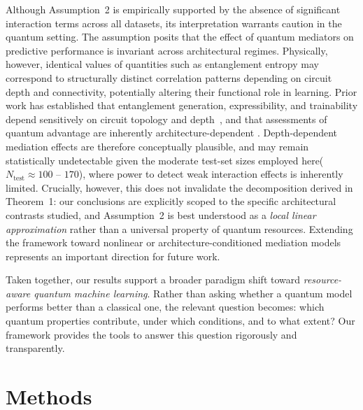 \documentclass[
    reprint,
    amsmath, amssymb,
    aps,
    floatfix,
    nofootinbib
]{revtex4-1}
\begin{document}
Although Assumption~2 is empirically supported by the absence of significant  interaction terms across all datasets, its interpretation warrants caution in the quantum setting. The assumption posits that the effect of quantum  mediators on predictive performance is invariant across architectural regimes.  Physically, however, identical values of quantities such as entanglement  entropy may correspond to structurally distinct correlation patterns depending on circuit depth and connectivity, potentially altering their functional role in learning. Prior work has established that entanglement generation, expressibility, and trainability depend sensitively on circuit topology and depth~\cite{sim2019expressibility, zhang2025machine}, and that assessments of quantum advantage are inherently architecture-dependent \cite{schuld2022quantum}. Depth-dependent mediation effects are therefore conceptually plausible, and may remain statistically undetectable given the moderate test-set sizes employed here($N_{\text{test}} \approx 100$ -- $170$), where power to detect weak interaction effects is inherently limited. Crucially, however, this does not invalidate the decomposition derived in Theorem~1: our conclusions are explicitly scoped to the specific architectural contrasts studied, and Assumption~2 is best understood as a \emph{local linear approximation} rather than a universal property of quantum resources. Extending the framework toward nonlinear or architecture-conditioned mediation models represents an important direction for future work.

Taken together, our results support a broader paradigm shift toward \emph{resource-aware quantum machine learning}. Rather than asking whether a quantum model performs better than a classical one, the relevant question becomes: which quantum properties contribute, under which conditions, and to what extent? Our framework provides the tools to answer this question rigorously and transparently. 

\section{Methods}
\label{sec:threshold}
\end{document}
